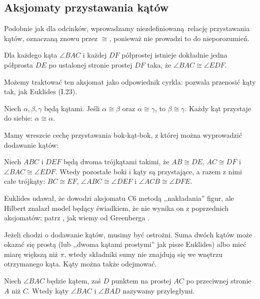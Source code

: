 \subsection{Aksjomaty przystawania kątów}
Podobnie jak dla odcinków, wprowadzamy niezdefiniowaną relację przystawania kątów, oznaczaną znowu przez $\cong$, ponieważ nie prowadzi to do nieporozumień.

\begin{axiom}[przystawania, C4]
    Dla każdego kąta $\angle BAC$ i każdej $DF$ półprostej istnieje dokładnie jedna półprosta $DE$ po ustalonej stronie prostej $DF$ taka, że $\angle BAC \cong \angle EDF$.
\end{axiom}

Możemy traktować ten aksjomat jako odpowiednik cyrkla: pozwala przenosić kąty tak, jak Euklides (I.23).

\begin{axiom}[przystawania, C5]
    Niech $\alpha, \beta, \gamma$ będą kątami.
    Jeśli $\alpha \cong \beta$ oraz $\alpha \cong \gamma$, to $\beta \cong \gamma$.
    Każdy kąt przystaje do siebie: $\alpha \cong \alpha$.
\end{axiom}

Mamy wreszcie cechę przystawania bok-kąt-bok, z której można wyprowadzić dodawanie kątów:

\begin{axiom}[przystawania, C6]
    Niech $ABC$ i $DEF$ będą dwoma trójkątami takimi, że $AB \cong DE$, $AC \cong DF$ i $\angle BAC \cong \angle EDF$.
    Wtedy pozostałe boki i kąty są przystające, a razem z nimi całe trójkąty: $BC \cong EF$, $\angle ABC \cong \angle DEF$ i $\angle ACB \cong \angle DFE$.
\end{axiom}

Euklides udawał, że dowodzi aksjomatu C6 metodą ,,nakładania'' figur, ale Hilbert znalazł model będący świadkiem, że nie wynika on z poprzednich aksjomatów; patrz \cite[paragraf 11]{hilbert_1988}, jak wiemy od Greenberga \cite[s. 200]{greenberg_2010}.

Jeżeli chodzi o dodawanie kątów, musimy być ostrożni.
Suma dwóch kątów może okazać się prostą (lub ,,dwoma kątami prostymi'' jak pisze Euklides) albo mieć miarę większą niż $\pi$, wtedy składniki sumy nie znajdują się we wnętrzu otrzymanego kąta.
Kąty można także odejmować.

\begin{definition}
    Niech $\angle BAC$ będzie kątem, zaś $D$ punktem na prostej $AC$ po przeciwnej stronie $A$ niż $C$.
    Wtedy kąty $\angle BAC$ i $\angle BAD$ nazywamy przyległymi. %
\end{definition}

